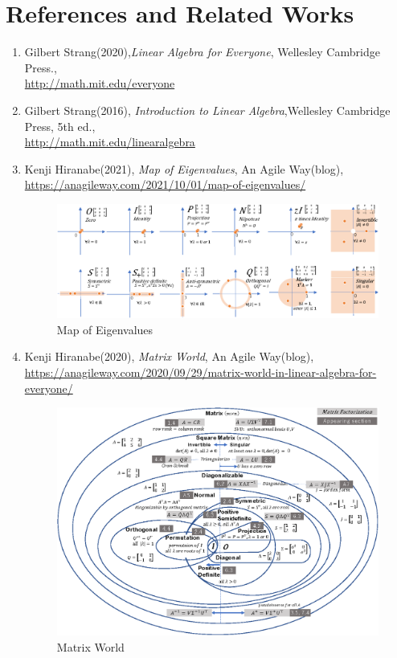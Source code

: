 \documentclass[letterpaper]{article}
\begin{document}
\section*{References and Related Works}
\begin{enumerate}
  \item 
  Gilbert Strang(2020),\emph{Linear Algebra for Everyone}, Wellesley Cambridge Press.,\\
  \href{http://math.mit.edu/everyone}{http://math.mit.edu/everyone}
  \item
  Gilbert Strang(2016), \emph{Introduction to Linear Algebra},Wellesley Cambridge Press, 5th ed.,\\
  \href{http://math.mit.edu/linearalgebra}{http://math.mit.edu/linearalgebra}
  \item Kenji Hiranabe(2021), \emph{Map of Eigenvalues}, An Agile Way(blog),\\
  \href{https://anagileway.com/2021/10/01/map-of-eigenvalues/}{https://anagileway.com/2021/10/01/map-of-eigenvalues/}\\
  \begin{figure}[H]
    \centering
    \includegraphics[keepaspectratio, width=\linewidth]{MapofEigenvalues.eps}
    \caption{Map of Eigenvalues}
  \end{figure}
  \item Kenji Hiranabe(2020), \emph{Matrix World}, An Agile Way(blog),\\
  \href{https://anagileway.com/2020/09/29/matrix-world-in-linear-algebra-for-everyone/}{https://anagileway.com/2020/09/29/matrix-world-in-linear-algebra-for-everyone/}
  \begin{figure}[H]
    \centering
    \includegraphics[keepaspectratio, width=\linewidth]{MatrixWorld.eps}
    \caption{Matrix World}
  \end{figure}
\end{enumerate}
\end{document}
